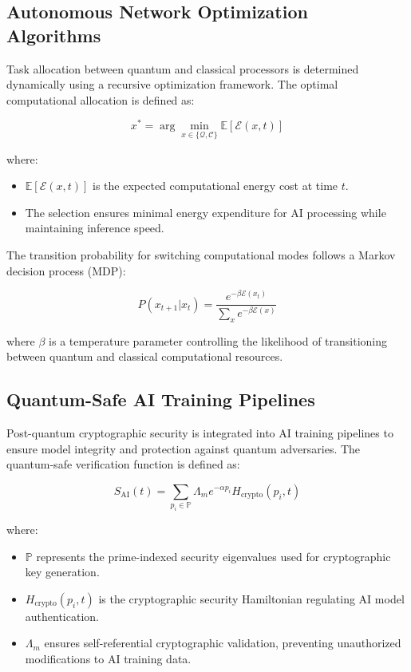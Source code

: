 \documentclass{article}
\theoremstyle{plain}
\begin{document}
\subsection{Autonomous Network Optimization Algorithms}

Task allocation between quantum and classical processors is determined dynamically using a recursive optimization framework. The optimal computational allocation is defined as:

\begin{equation}
    x^* = \arg\min_{x \in \{\mathcal{Q}, \mathcal{C}\}} \mathbb{E}[\mathcal{E}(x, t)]
\end{equation}

where:
\begin{itemize}
    \item $\mathbb{E}[\mathcal{E}(x, t)]$ is the expected computational energy cost at time $t$.
    \item The selection ensures minimal energy expenditure for AI processing while maintaining inference speed.
\end{itemize}

The transition probability for switching computational modes follows a Markov decision process (MDP):

\begin{equation}
    P(x_{t+1} | x_t) = \frac{e^{-\beta \mathcal{E}(x_t)}}{\sum_{x} e^{-\beta \mathcal{E}(x)}}
\end{equation}

where $\beta$ is a temperature parameter controlling the likelihood of transitioning between quantum and classical computational resources.

\subsection{Quantum-Safe AI Training Pipelines}

Post-quantum cryptographic security is integrated into AI training pipelines to ensure model integrity and protection against quantum adversaries. The quantum-safe verification function is defined as:

\begin{equation}
    S_{\text{AI}}(t) = \sum_{p_i \in \mathbb{P}} \Lambda_m e^{-\alpha p_i} H_{\text{crypto}}(p_i, t)
\end{equation}

where:
\begin{itemize}
    \item $\mathbb{P}$ represents the prime-indexed security eigenvalues used for cryptographic key generation.
    \item $H_{\text{crypto}}(p_i, t)$ is the cryptographic security Hamiltonian regulating AI model authentication.
    \item $\Lambda_m$ ensures self-referential cryptographic validation, preventing unauthorized modifications to AI training data.
\end{itemize}
\end{document}
